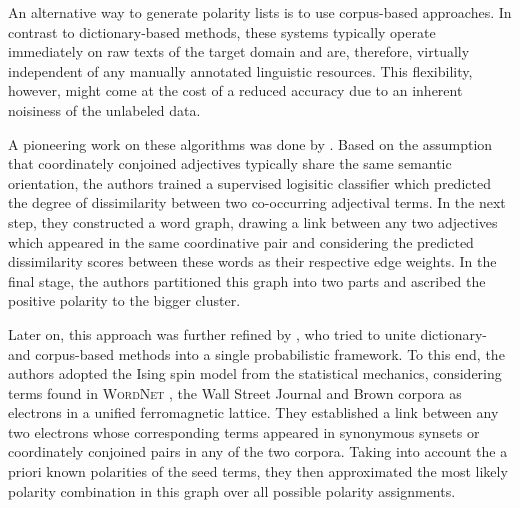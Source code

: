 An alternative way to generate polarity lists is to use corpus-based
approaches.  In contrast to dictionary-based methods, these systems
typically operate immediately on raw texts of the target domain and
are, therefore, virtually independent of any manually annotated
linguistic resources.  This flexibility, however, might come at the
cost of a reduced accuracy due to an inherent noisiness of the
unlabeled data.

A pioneering work on these algorithms was done by
\citet{Hatzivassi:97}.  Based on the assumption that coordinately
conjoined adjectives typically share the same semantic orientation,
the authors trained a supervised logisitic classifier which predicted
the degree of dissimilarity between two co-occurring adjectival terms.
In the next step, they constructed a word graph, drawing a link
between any two adjectives which appeared in the same coordinative
pair and considering the predicted dissimilarity scores between these
words as their respective edge weights.  In the final stage, the
authors partitioned this graph into two parts and ascribed the
positive polarity to the bigger cluster.

Later on, this approach was further refined by \citet{Takamura:05},
who tried to unite dictionary- and corpus-based methods into a single
probabilistic framework.  To this end, the authors adopted the Ising
spin model from the statistical mechanics, considering terms found in
\textsc{WordNet} \cite{Miller:95}, the Wall Street Journal and Brown
corpora as electrons in a unified ferromagnetic lattice.  They
established a link between any two electrons whose corresponding terms
appeared in synonymous synsets or coordinately conjoined pairs in any
of the two corpora.  Taking into account the a priori known polarities
of the seed terms, they then approximated the most likely polarity
combination in this graph over all possible polarity assignments.

